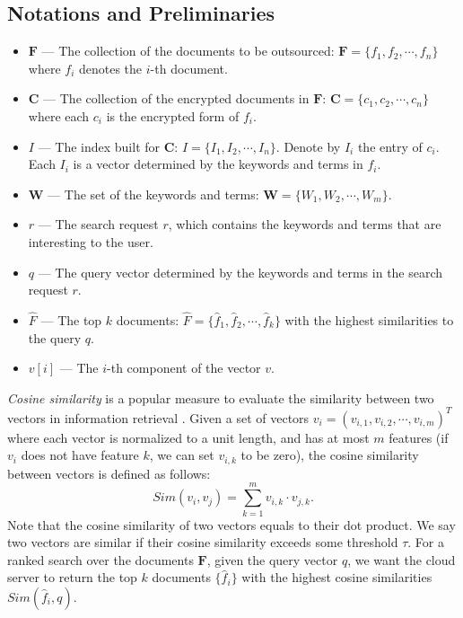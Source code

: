 \documentclass{IEEEtran}
\begin{document}
\subsection{Notations and Preliminaries}
\begin{itemize}
\item $\mathbf{F}$ \---- The collection of the documents to be outsourced: $\mathbf{F} = \{f_1, f_2, \cdots, f_n\}$ where $f_i$ denotes the $i$-th document.
\item $\mathbf{C}$ \---- The collection of the encrypted documents in $\mathbf{F}$: $\mathbf{C} = \{c_1, c_2, \cdots, c_n\}$ where each $c_i$ is the encrypted form of $f_i$.
\item $I$ \---- The index built for $\mathbf{C}$: $I = \{I_1, I_2, \cdots, I_n\}$. Denote by $I_i$ the entry of $c_i$. Each $I_i$ is a vector determined by the keywords and terms in $f_i$.
\item $\mathbf{W}$ \---- The set of the keywords and terms: $\mathbf{W} = \{W_1, W_2, \cdots, W_m\}$.
\item $r$ \---- The search request $r$, which contains the keywords and terms that are interesting to the user.
\item $q$ \---- The query vector determined by the keywords and terms in the search request $r$.
\item $\hat{F}$ \---- The top $k$ documents: $\hat{F} = \{\hat{f}_1, \hat{f}_2, \cdots, \hat{f}_k\}$ with the highest similarities to the query $q$.
\item $v[i]$ \---- The $i$-th component of the vector $v$.
\end{itemize}

\emph{Cosine similarity} is a popular measure to evaluate the similarity between two vectors in information retrieval \cite{ATY13,TAJY14}. Given a set of vectors $v_i = (v_{i,1}, v_{i,2}, \cdots, v_{i,m})^T$ where each vector is normalized to a unit length, and has at most $m$ features (if $v_i$ does not have feature $k$, we can set $v_{i,k}$ to be zero), the cosine similarity between vectors is defined as follows:
$$Sim(v_i,v_j) = \sum_{k=1}^m v_{i,k}\cdot v_{j,k}.$$
Note that the cosine similarity of two vectors equals to their dot product. We say two vectors are similar if their cosine similarity exceeds some threshold $\tau$. For a ranked search over the documents $\mathbf{F}$, given the query vector $q$, we want the cloud server to return the top $k$ documents $\{\hat{f}_i\}$ with the highest cosine similarities $Sim(\hat{f}_i, q)$.
\end{document}
